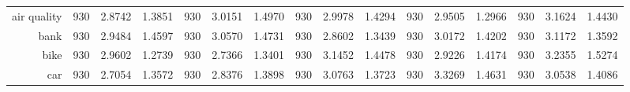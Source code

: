 \begin{table}[htbp]
{\begin{tabular}{rccccccccccccccc}
			air quality                         & 930                                 & \cellcolor[rgb]{ .776,  .937,  .808}\textcolor[rgb]{ 0,  .38,  0}{2.8742} & 1.3851          & 930                            & 3.0151                                                                             & 1.4970          & 930                             & 2.9978                                                                    & 1.4294          & 930                             & 2.9505                                                                    & 1.2966          & 930                             & 3.1624          & 1.4430          \\
			bank                                & 930                                 & 2.9484                                                                    & 1.4597          & 930                            & 3.0570                                                                             & 1.4731          & 930                             & \cellcolor[rgb]{ .776,  .937,  .808}\textcolor[rgb]{ 0,  .38,  0}{2.8602} & 1.3439          & 930                             & 3.0172                                                                    & 1.4202          & 930                             & 3.1172          & 1.3592          \\
			bike                                & 930                                 & 2.9602                                                                    & 1.2739          & 930                            & \cellcolor[rgb]{ .776,  .937,  .808}\textcolor[rgb]{ 0,  .38,  0}{2.7366}          & 1.3401          & 930                             & 3.1452                                                                    & 1.4478          & 930                             & 2.9226                                                                    & 1.4174          & 930                             & 3.2355          & 1.5274          \\
			car                                 & 930                                 & \cellcolor[rgb]{ .776,  .937,  .808}\textcolor[rgb]{ 0,  .38,  0}{2.7054} & 1.3572          & 930                            & 2.8376                                                                             & 1.3898          & 930                             & 3.0763                                                                    & 1.3723          & 930                             & 3.3269                                                                    & 1.4631          & 930                             & 3.0538          & 1.4086          \\

\end{tabular}}
\end{table}
